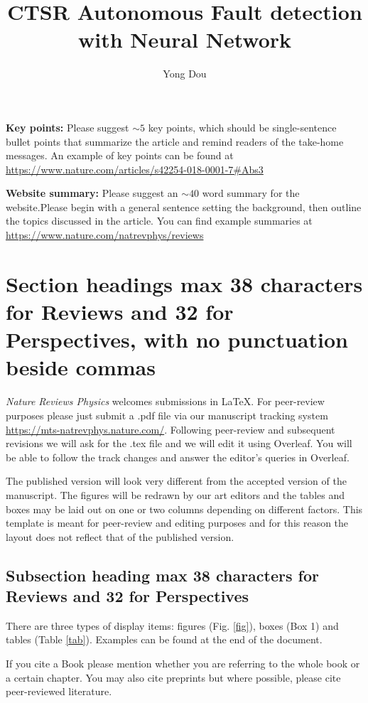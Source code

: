 \documentclass[fleqn,10pt]{wlscirep}
\title{CTSR Autonomous Fault detection with Neural Network}
\author[1,*]{Yong Dou}
\affil[1]{Columbia University, Department of Chemical Engineering ,New York, NY}
\affil[*]{e-mail:yd2373@columbia.edu}
\begin{document}
\flushbottom
\maketitle

\thispagestyle{empty}

\noindent \textbf{Key points:} Please suggest $\sim 5$ key points, which should be single-sentence bullet points that summarize the article and remind readers of the take-home messages. An example of key points can be found at \url{https://www.nature.com/articles/s42254-018-0001-7#Abs3}

\noindent \textbf{Website summary:} Please suggest an $\sim 40$ word summary for the website.Please begin with a general sentence setting the background, then outline the topics discussed in the article. You can find example summaries at \url{https://www.nature.com/natrevphys/reviews}

\section*{Section headings max 38 characters for Reviews and 32 for Perspectives, with no punctuation beside commas}
\textit{Nature Reviews Physics} welcomes submissions in \LaTeX. For  peer-review purposes please just submit a .pdf file via our manuscript tracking system \url{https://mts-natrevphys.nature.com/}. Following peer-review and subsequent revisions we will ask for the .tex file and we will edit it using Overleaf. You will be able to follow the track changes and answer the editor's queries in Overleaf.

The published version will look very different from the accepted version of the manuscript. The figures will be redrawn by our art editors and the tables and boxes may be laid out  on one or two columns depending on different factors. This template is meant for peer-review and editing purposes and for this reason the layout does not reflect that of the published version. 

\subsection*{Subsection heading max 38 characters for Reviews and 32 for Perspectives}
There are three types of display items: figures (Fig. \ref{fig}), boxes (Box 1) and tables (Table \ref{tab}). Examples can be found at the end of the document.

If you cite a Book \cite{Book} please mention whether you are referring to the whole book or a certain chapter. You may also cite preprints\cite{arxiv} but where possible, please cite peer-reviewed literature.
\end{document}
